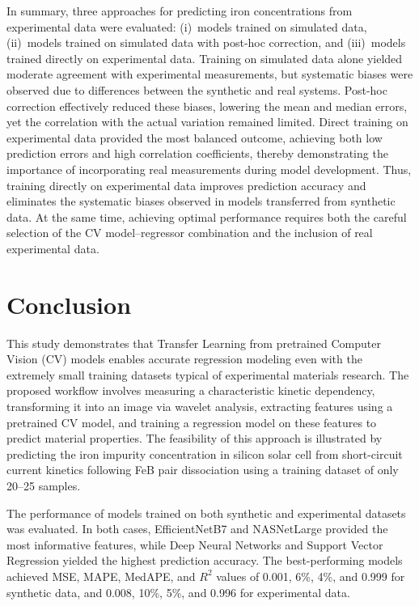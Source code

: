 \documentclass[10pt]{iopart}
\begin{document}
In summary, three approaches for predicting iron concentrations from experimental data were evaluated:
(i)~models trained on simulated data,
(ii)~models trained on simulated data with post-hoc correction,
and (iii)~models trained directly on experimental data.
Training on simulated data alone yielded moderate agreement with experimental measurements,
but systematic biases were observed due to differences between the synthetic and real systems.
Post-hoc correction effectively reduced these biases, lowering the mean and median errors,
yet the correlation with the actual variation remained limited.
Direct training on experimental data provided the most balanced outcome,
achieving both low prediction errors and high correlation coefficients,
thereby demonstrating the importance of incorporating real measurements during model development.
Thus, training directly on experimental data improves prediction accuracy and eliminates the systematic biases observed in models transferred from synthetic data.
At the same time, achieving optimal performance requires both the careful selection of the CV model–regressor combination and the inclusion of real experimental data.


\section{Conclusion}

This study demonstrates that Transfer Learning from pretrained Computer Vision (CV) models enables accurate regression modeling 
even with the extremely small training datasets typical of experimental materials research. 
The proposed workflow involves measuring a characteristic kinetic dependency, 
transforming it into an image via wavelet analysis, 
extracting features using a pretrained CV model, 
and training a regression model on these features to predict material properties. 
The feasibility of this approach is illustrated by predicting the iron impurity concentration in silicon solar cell 
from short-circuit current kinetics following FeB pair dissociation using a training dataset of only 20–25 samples.

The performance of models trained on both synthetic and experimental datasets was evaluated. 
In both cases, EfficientNetB7 and NASNetLarge provided the most informative features, 
while Deep Neural Networks  and  Support Vector Regression yielded the highest prediction accuracy. 
The best-performing models achieved MSE, MAPE, MedAPE, and $R^2$ values of 0.001, 6\%, 4\%, and 0.999 for synthetic data, 
and 0.008, 10\%, 5\%, and 0.996 for experimental data.
\end{document}
